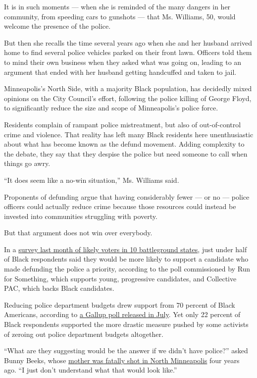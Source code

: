 It is in such moments --- when she is reminded of the many dangers in
her community, from speeding cars to gunshots --- that Ms. Williams, 50,
would welcome the presence of the police.

But then she recalls the time several years ago when she and her husband
arrived home to find several police vehicles parked on their front lawn.
Officers told them to mind their own business when they asked what was
going on, leading to an argument that ended with her husband getting
handcuffed and taken to jail.

Minneapolis's North Side, with a majority Black population, has
decidedly mixed opinions on the City Council's effort, following the
police killing of George Floyd, to significantly reduce the size and
scope of Minneapolis's police force.

Residents complain of rampant police mistreatment, but also of
out-of-control crime and violence. That reality has left many Black
residents here unenthusiastic about what has become known as the defund
movement. Adding complexity to the debate, they say that they despise
the police but need someone to call when things go awry.

``It does seem like a no-win situation,'' Ms. Williams said.

Proponents of defunding argue that having considerably fewer --- or no
--- police officers could actually reduce crime because those resources
could instead be invested into communities struggling with poverty.

But that argument does not win over everybody.

In a
\href{https://runforsomething.net/wp-content/uploads/2020/07/PoliceReform_deck-d8.pdf}{survey
last month of likely voters in 10 battleground states}, just under half
of Black respondents said they would be more likely to support a
candidate who made defunding the police a priority, according to the
poll commissioned by Run for Something, which supports young,
progressive candidates, and Collective PAC, which backs Black
candidates.

Reducing police department budgets drew support from 70 percent of Black
Americans, according to
\href{https://news.gallup.com/poll/315962/americans-say-policing-needs-major-changes.aspx}{a
Gallup poll released in July}. Yet only 22 percent of Black respondents
supported the more drastic measure pushed by some activists of zeroing
out police department budgets altogether.

``What are they suggesting would be the answer if we didn't have
police?'' asked Bunny Beeks, whose
\href{https://www.mprnews.org/story/2017/12/19/random-bullet-killed-birdell-beeks-her-daughter-wouldnt-let-her-name-die}{mother
was fatally shot in North Minneapolis} four years ago. ``I just don't
understand what that would look like.''

